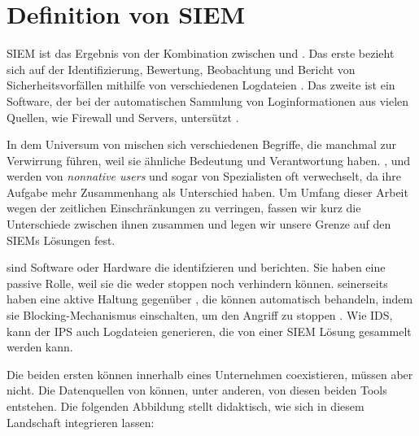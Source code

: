 \section{Definition von SIEM}

\gls{SIEM} ist das Ergebnis von der Kombination zwischen  und  \citep{Dorigo_SIEM}. Das erste bezieht sich auf der Identifizierung, Bewertung, Beobachtung und Bericht von Sicherheitsvorfällen mithilfe von verschiedenen Logdateien \citep{techopedia_SEM}. Das zweite ist ein Software, der bei der automatischen Sammlung von Loginformationen aus vielen Quellen, wie Firewall und Servers, untersützt \cite{techopedia_SIM}. 

In dem Universum von  mischen sich verschiedenen Begriffe, die manchmal zur Verwirrung führen, weil sie ähnliche Bedeutung und Verantwortung haben. ,  und  werden von \textit{nonnative users} und sogar von Spezialisten oft verwechselt, da ihre Aufgabe mehr Zusammenhang als Unterschied haben. Um Umfang dieser Arbeit wegen der zeitlichen Einschränkungen zu verringen, fassen wir kurz die Unterschiede zwischen ihnen zusammen und legen wir unsere Grenze auf den \glspl{SIEM} Lösungen fest.

 sind Software oder Hardware die  identifzieren und berichten. Sie haben eine passive Rolle, weil sie die  weder stoppen noch verhindern können.  seinerseits haben eine aktive Haltung gegenüber , die können automatisch behandeln, indem sie Blocking-Mechanismus einschalten, um den Angriff zu stoppen \citep{Wendzel_IS}. Wie \gls{IDS}, kann der \gls{IPS} auch Logdateien generieren, die von einer \gls{SIEM} Lösung gesammelt werden kann. 

Die beiden ersten können innerhalb eines Unternehmen coexistieren, müssen aber nicht. Die Datenquellen von  können, unter anderen, von diesen beiden Tools entstehen. Die folgenden Abbildung stellt didaktisch, wie sich  in diesem Landschaft integrieren lassen: 


